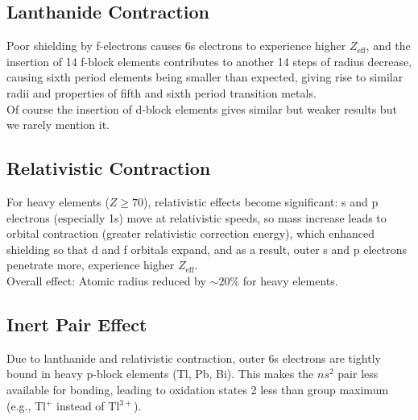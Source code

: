 \subsection{Lanthanide Contraction}\label{radius}

Poor shielding by f-electrons causes 6s electrons to experience higher $Z_{\text{eff}}$, 
and the insertion of 14 f-block elements contributes to another 14 steps of radius decrease, 
causing sixth period elements being smaller than expected, giving rise to similar radii and properties of fifth and sixth period transition metals.\\
Of course the insertion of d-block elements gives similar but weaker results but we rarely mention it.   

\subsection{Relativistic Contraction}

For heavy elements ($Z \geq 70$), relativistic effects become significant:
s and p electrons (especially 1s) move at relativistic speeds, so
mass increase leads to orbital contraction (greater relativistic correction energy),
which enhanced shielding so that d and f orbitals expand,
and as a result, outer s and p electrons penetrate more, experience higher $Z_{\text{eff}}$.\\
Overall effect: Atomic radius reduced by $\sim 20\%$ for heavy elements.

\subsection{Inert Pair Effect}

Due to lanthanide and relativistic contraction, outer 6s electrons are tightly bound in heavy p-block elements (Tl, Pb, Bi). This makes the $ns^2$ pair less available for bonding, leading to oxidation states 2 less than group maximum (e.g., Tl$^+$ instead of Tl$^{3+}$).
